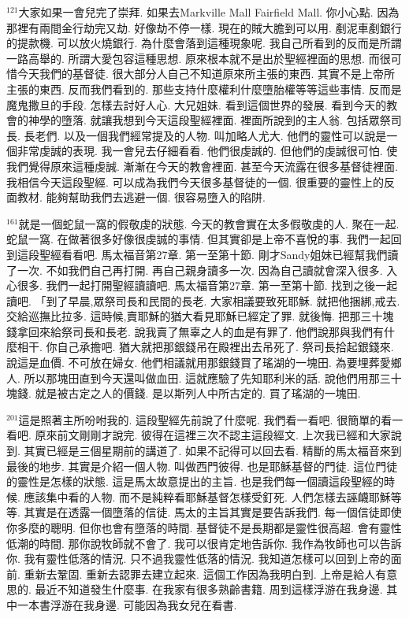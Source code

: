 \documentclass{book}
\begin{document}
$^{121}$大家如果一會兒完了崇拜.
如果去Markville Mall Fairfield Mall.
你小心點.
因為那裡有兩間金行劫完又劫.
好像劫不停一樣.
現在的賊大膽到可以用.
剷泥車剷銀行的提款機.
可以放火燒銀行.
為什麼會落到這種現象呢.
我自己所看到的反而是所謂一路高舉的.
所謂大愛包容這種思想.
原來根本就不是出於聖經裡面的思想.
而很可惜今天我們的基督徒.
很大部分人自己不知道原來所主張的東西.
其實不是上帝所主張的東西.
反而我們看到的.
那些支持什麼權利什麼墮胎權等等這些事情.
反而是魔鬼撒旦的手段.
怎樣去討好人心.
大兄姐妹.
看到這個世界的發展.
看到今天的教會的神學的墮落.
就讓我想到今天這段聖經裡面.
裡面所說到的主人翁.
包括眾祭司長.
長老們.
以及一個我們經常提及的人物.
叫加略人尤大.
他們的靈性可以說是一個非常虔誠的表現.
我一會兒去仔細看看.
他們很虔誠的.
但他們的虔誠很可怕.
使我們覺得原來這種虔誠.
漸漸在今天的教會裡面.
甚至今天流露在很多基督徒裡面.
我相信今天這段聖經.
可以成為我們今天很多基督徒的一個.
很重要的靈性上的反面教材.
能夠幫助我們去逃避一個.
很容易墮入的陷阱.

$^{161}$就是一個蛇鼠一窩的假敬虔的狀態.
今天的教會實在太多假敬虔的人.
聚在一起.
蛇鼠一窩.
在做著很多好像很虔誠的事情.
但其實卻是上帝不喜悅的事.
我們一起回到這段聖經看看吧.
馬太福音第27章.
第一至第十節.
剛才Sandy姐妹已經幫我們讀了一次.
不如我們自己再打開.
再自己親身讀多一次.
因為自己讀就會深入很多.
入心很多.
我們一起打開聖經讀讀吧.
馬太福音第27章.
第一至第十節.
找到之後一起讀吧.
「到了早晨,眾祭司長和民間的長老.
大家相議要致死耶穌.
就把他捆綁,戒去.
交給巡撫比拉多.
這時候,賣耶穌的猶大看見耶穌已經定了罪.
就後悔.
把那三十塊錢拿回來給祭司長和長老.
說我賣了無辜之人的血是有罪了.
他們說那與我們有什麼相干.
你自己承擔吧.
猶大就把那銀錢吊在殿裡出去吊死了.
祭司長拾起銀錢來.
說這是血價.
不可放在婦女.
他們相議就用那銀錢買了瑤湖的一塊田.
為要埋葬愛鄉人.
所以那塊田直到今天還叫做血田.
這就應驗了先知耶利米的話.
說他們用那三十塊錢.
就是被古定之人的價錢.
是以斯列人中所古定的.
買了瑤湖的一塊田.

$^{201}$這是照著主所吩咐我的.
這段聖經先前說了什麼呢.
我們看一看吧.
很簡單的看一看吧.
原來前文剛剛才說完.
彼得在這裡三次不認主這段經文.
上次我已經和大家說到.
其實已經是三個星期前的講道了.
如果不記得可以回去看.
精斷的馬太福音來到最後的地步.
其實是介紹一個人物.
叫做西門彼得.
也是耶穌基督的門徒.
這位門徒的靈性是怎樣的狀態.
這是馬太故意提出的主旨.
也是我們每一個讀這段聖經的時候.
應該集中看的人物.
而不是純粹看耶穌基督怎樣受釘死.
人們怎樣去誣衊耶穌等等.
其實是在透露一個墮落的信徒.
馬太的主旨其實是要告訴我們.
每一個信徒即使你多麼的聰明.
但你也會有墮落的時間.
基督徒不是長期都是靈性很高超.
會有靈性低潮的時間.
那你說牧師就不會了.
我可以很肯定地告訴你.
我作為牧師也可以告訴你.
我有靈性低落的情況.
只不過我靈性低落的情況.
我知道怎樣可以回到上帝的面前.
重新去鞏固.
重新去認罪去建立起來.
這個工作因為我明白到.
上帝是給人有意思的.
最近不知道發生什麼事.
在我家有很多熟齡書籍.
周到這樣浮游在我身邊.
其中一本書浮游在我身邊.
可能因為我女兒在看書.
\end{document}
